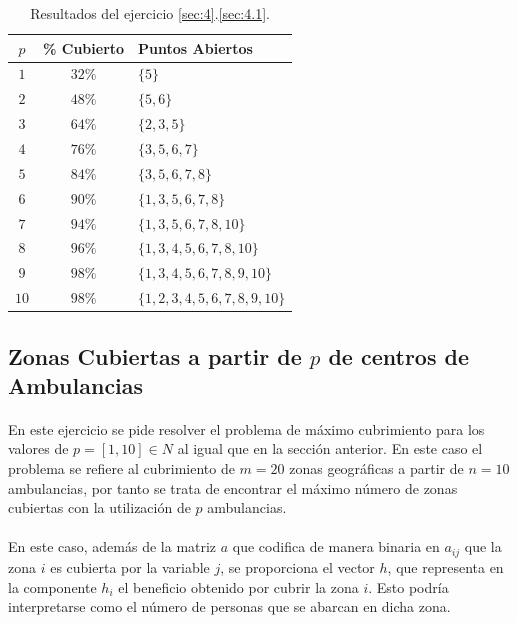 \documentclass[spanish]{article}
\begin{document}
			\begin{table}[h]
				\begin{center}
					\begin{tabular}{|c || c || l |}
						\hline
						$p$		&	\% Cubierto	& Puntos Abiertos \\ \hline \hline
						$1$ 	& $32\%$ & $\{5\}$ \\ \hline
		     		$2$ 	& $48\%$ & $\{5, 6\}$ \\ \hline
						$3$ 	& $64\%$ & $\{2,3,5\}$ \\ \hline
						$4$ 	& $76\%$ & $\{3,5,6,7\}$ \\ \hline
						$5$ 	& $84\%$ & $\{3,5,6,7,8\}$ \\ \hline
						$6$ 	& $90\%$ & $\{1,3,5,6,7,8\}$ \\ \hline
						$7$ 	& $94\%$ & $\{1,3,5,6,7,8,10\}$ \\ \hline
						$8$ 	& $96\%$ & $\{1,3,4,5,6,7,8,10\}$ \\ \hline
						$9$ 	& $98\%$ & $\{1,3,4,5,6,7,8,9,10 \}$ \\ \hline
						$10$	& $98\%$ & $\{1,2,3,4,5,6,7,8,9,10\}$ \\
						\hline
					\end{tabular}
				\end{center}
				\caption{Resultados del ejercicio \ref{sec:4}.\ref{sec:4.1}.}
				\label{table:sol-4.1}
			\end{table}


		\subsection{Zonas Cubiertas a partir de $p$ de centros de Ambulancias}
		\label{sec:4.2}

			\paragraph{}
			En este ejercicio se pide resolver el problema de máximo cubrimiento para los valores de $p = [1, 10] \in N$ al igual que en la sección anterior. En este caso el problema se refiere al cubrimiento de $m = 20$ zonas geográficas a partir de $n=10$ ambulancias, por tanto se trata de encontrar el máximo número de zonas cubiertas con la utilización de $p$ ambulancias.

			\paragraph{}
			En este caso, además de la matriz $a$ que codifica de manera binaria en $a_{ij}$ que la zona $i$ es cubierta por la variable $j$, se proporciona el vector $h$, que representa en la componente $h_i$ el beneficio obtenido por cubrir la zona $i$. Esto podría interpretarse como el número de personas que se abarcan en dicha zona.
\end{document}
